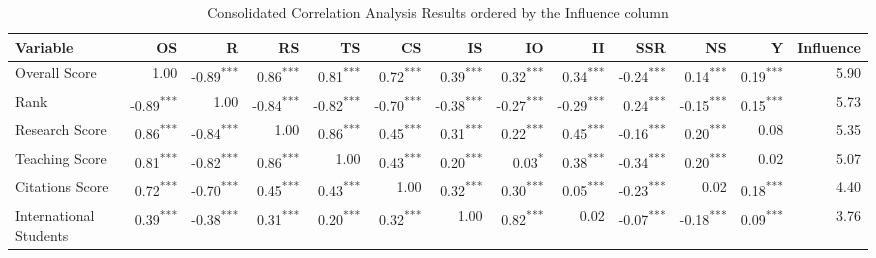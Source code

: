 \documentclass[conference]{IEEEtran}
\begin{document}
\begin{table*}[h!]
	\centering
	\caption{Consolidated Correlation Analysis Results ordered by the Influence column}
	
	\label{tab:correlation_combined}
	\scriptsize
	\begin{tabular}{|l|r|r|r|r|r|r|r|r|r|r|r|r|}
		\hline
		\textbf{Variable} & \textbf{OS} & \textbf{R} & \textbf{RS} & \textbf{TS} & \textbf{CS} & \textbf{IS} & \textbf{IO} & \textbf{II} & \textbf{SSR} & \textbf{NS} & \textbf{Y} & \textbf{Influence} \\
		\hline
		Overall Score & 1.00 & -0.89\textsuperscript{***} & 0.86\textsuperscript{***} & 0.81\textsuperscript{***} & 0.72\textsuperscript{***} & 0.39\textsuperscript{***} & 0.32\textsuperscript{***} & 0.34\textsuperscript{***} & -0.24\textsuperscript{***} & 0.14\textsuperscript{***} & 0.19\textsuperscript{***} & 5.90 \\
		Rank & -0.89\textsuperscript{***} & 1.00 & -0.84\textsuperscript{***} & -0.82\textsuperscript{***} & -0.70\textsuperscript{***} & -0.38\textsuperscript{***} & -0.27\textsuperscript{***} & -0.29\textsuperscript{***} & 0.24\textsuperscript{***} & -0.15\textsuperscript{***} & 0.15\textsuperscript{***} & 5.73 \\
		Research Score & 0.86\textsuperscript{***} & -0.84\textsuperscript{***} & 1.00 & 0.86\textsuperscript{***} & 0.45\textsuperscript{***} & 0.31\textsuperscript{***} & 0.22\textsuperscript{***} & 0.45\textsuperscript{***} & -0.16\textsuperscript{***} & 0.20\textsuperscript{***} & 0.08 & 5.35 \\
		Teaching Score & 0.81\textsuperscript{***} & -0.82\textsuperscript{***} & 0.86\textsuperscript{***} & 1.00 & 0.43\textsuperscript{***} & 0.20\textsuperscript{***} & 0.03\textsuperscript{*} & 0.38\textsuperscript{***} & -0.34\textsuperscript{***} & 0.20\textsuperscript{***} & 0.02 & 5.07 \\
		Citations Score & 0.72\textsuperscript{***} & -0.70\textsuperscript{***} & 0.45\textsuperscript{***} & 0.43\textsuperscript{***} & 1.00 & 0.32\textsuperscript{***} & 0.30\textsuperscript{***} & 0.05\textsuperscript{***} & -0.23\textsuperscript{***} & 0.02 & 0.18\textsuperscript{***} & 4.40 \\
		International Students & 0.39\textsuperscript{***} & -0.38\textsuperscript{***} & 0.31\textsuperscript{***} & 0.20\textsuperscript{***} & 0.32\textsuperscript{***} & 1.00 & 0.82\textsuperscript{***} & 0.02 & -0.07\textsuperscript{***} & -0.18\textsuperscript{***} & 0.09\textsuperscript{***} & 3.76 \\

\end{tabular}
\end{table*}
\end{document}
